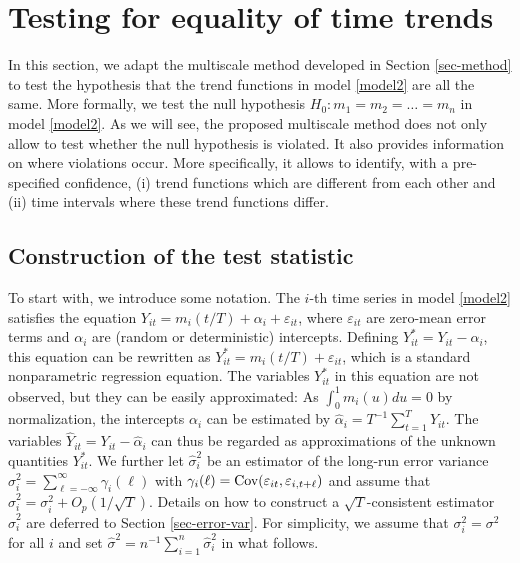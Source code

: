 \documentclass[a4paper,12pt]{article}
\numberwithin{equation}{section}
\begin{document}
\section{Testing for equality of time trends}\label{sec-test-equality}


In this section, we adapt the multiscale method developed in Section \ref{sec-method} to test the hypothesis that the trend functions in model \eqref{model2} are all the same. More formally, we test the null hypothesis $H_0: m_1 = m_2 = \ldots = m_n$ in model \eqref{model2}. As we will see, the proposed multiscale method does not only allow to test whether the null hypothesis is violated. It also provides information on where violations occur. More specifically, it allows to identify, with a pre-specified confidence, (i) trend functions which are different from each other and (ii) time intervals where these trend functions differ.


\subsection{Construction of the test statistic}\label{subsec-test-equality-stat}


To start with, we introduce some notation. The $i$-th time series in model \eqref{model2} satisfies the equation $Y_{it} = m_i(t/T) + \alpha_i + \varepsilon_{it}$, where $\varepsilon_{it}$ are zero-mean error terms and $\alpha_i$ are (random or deterministic) intercepts. Defining $Y_{it}^* = Y_{it} - \alpha_i$, this equation can be rewritten as $Y_{it}^* = m_i(t/T) + \varepsilon_{it}$, which is a standard nonparametric regression equation. The variables $Y_{it}^*$ in this equation are not observed, but they can be easily approximated: As $\int_0^1 m_i(u) du = 0$ by normalization, the intercepts $\alpha_i$ can be estimated by $\widehat{\alpha}_i = T^{-1} \sum_{t=1}^T Y_{it}$. The variables $\widehat{Y}_{it} = Y_{it} - \widehat{\alpha}_i$ can thus be regarded as approximations of the unknown quantities $Y_{it}^*$. We further let $\widehat{\sigma}_i^2$ be an estimator of the long-run error variance $\sigma_i^2 = \sum\nolimits_{\ell=-\infty}^{\infty} \gamma_i(\ell)$ with $\gamma_i(\ell) = \textnormal{Cov}(\varepsilon_{it}, \varepsilon_{i,t+\ell})$ and assume that $\widehat{\sigma}_i^2 = \sigma_i^2 + O_p(1/\sqrt{T})$. Details on how to construct a $\sqrt{T}$-consistent estimator $\widehat{\sigma}_i^2$ are deferred to Section \ref{sec-error-var}. For simplicity, we assume that $\sigma_i^2 = \sigma^2$ for all $i$ and set $\widehat{\sigma}^2 = n^{-1} \sum_{i=1}^n \widehat{\sigma}_i^2$ in what follows. 
\end{document}
